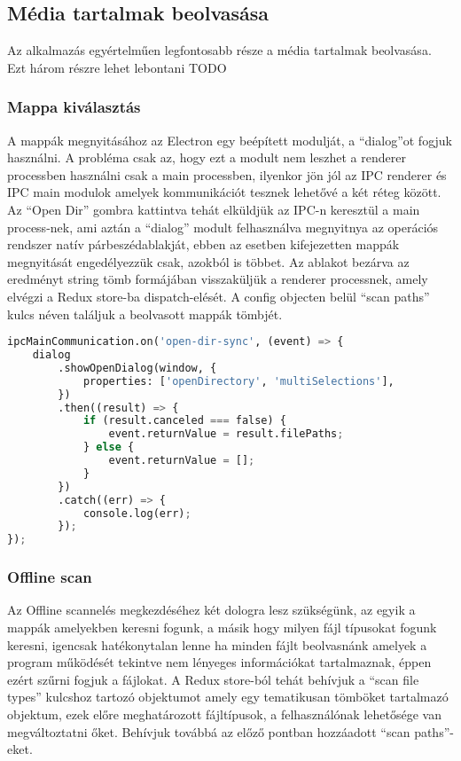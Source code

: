 \subsection{Média tartalmak beolvasása}
Az alkalmazás egyértelműen legfontosabb része a média tartalmak beolvasása. Ezt három részre lehet lebontani
TODO

\subsubsection{Mappa kiválasztás}
A mappák megnyitásához az Electron egy beépített modulját, a ``dialog''ot fogjuk használni. A probléma csak az, hogy ezt a modult nem leszhet a renderer processben használni csak a main processben, ilyenkor jön jól az IPC renderer és IPC main modulok amelyek kommunikációt tesznek lehetővé a két réteg között. Az ``Open Dir'' gombra kattintva tehát elküldjük az IPC-n keresztül a main process-nek, ami aztán a ``dialog'' modult felhasználva megnyitnya az operációs rendszer natív párbeszédablakját, ebben az esetben kifejezetten mappák megnyitását engedélyezzük csak, azokból is többet. Az ablakot bezárva az eredményt string tömb formájában visszaküljük a renderer processnek, amely elvégzi a Redux store-ba dispatch-elését. A config objecten belül ``scan paths'' kulcs néven találjuk a beolvasott mappák tömbjét.

\begin{lstlisting}[language={python}]
ipcMainCommunication.on('open-dir-sync', (event) => {
    dialog
        .showOpenDialog(window, {
            properties: ['openDirectory', 'multiSelections'],
        })
        .then((result) => {
            if (result.canceled === false) {
                event.returnValue = result.filePaths;
            } else {
                event.returnValue = [];
            }
        })
        .catch((err) => {
            console.log(err);
        });
});
\end{lstlisting}

\subsubsection{Offline scan}
Az Offline scannelés megkezdéséhez két dologra lesz szükségünk, az egyik a mappák amelyekben keresni fogunk, a másik hogy milyen fájl típusokat fogunk keresni, igencsak hatékonytalan lenne ha minden fájlt beolvasnánk amelyek a program működését tekintve nem lényeges információkat tartalmaznak, éppen ezért szűrni fogjuk a fájlokat. A Redux store-ból tehát behívjuk a ``scan file types'' kulcshoz tartozó objektumot amely egy tematikusan tömböket tartalmazó objektum, ezek előre meghatározott fájltípusok, a felhasználónak lehetősége van megváltoztatni őket. Behívjuk továbbá az előző pontban hozzáadott ``scan paths''-eket.


